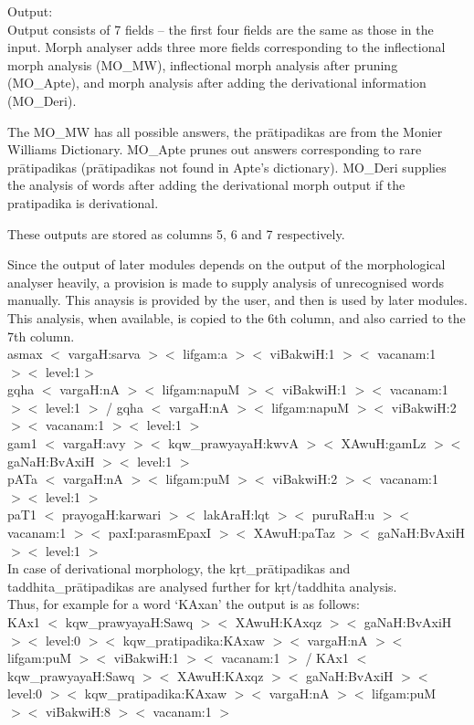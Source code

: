 \documentclass{llncs}
\begin{document}
\noindent 
Output:\\
Output consists of 7 fields -- the first four fields are the same as those in the input. Morph analyser adds three more fields corresponding to the inflectional morph analysis (MO\_MW), inflectional morph analysis after pruning (MO\_Apte), and morph analysis after adding the derivational information (MO\_Deri).

\noindent 
The MO\_MW has all possible answers, the pr\={a}tipadikas are from the Monier Williams Dictionary. MO\_Apte prunes out answers corresponding to rare pr\={a}tipadikas (pr\={a}tipadikas not found in Apte's dictionary). MO\_Deri supplies the analysis of words after adding the derivational morph output if the pratipadika is derivational.

\noindent 
These outputs are stored as columns 5, 6 and 7 respectively.

\noindent 
Since the output of later modules depends on the output of the morphological analyser heavily, a provision is made to supply analysis of unrecognised words manually. This anaysis is provided by the user, and then is used by later modules.
This analysis, when available, is copied to the  6th column, and also carried to the 7th column.\\
asmax $<$ vargaH:sarva $><$ lifgam:a $><$ viBakwiH:1 $><$ vacanam:1 $><$ level:1$>$\\
gqha $<$ vargaH:nA $><$ lifgam:napuM $><$ viBakwiH:1 $><$ vacanam:1 $><$ level:1 $>$ / 
gqha $<$ vargaH:nA $><$ lifgam:napuM $><$ viBakwiH:2 $><$ vacanam:1 $><$ level:1 $>$\\
gam1 $<$ vargaH:avy $><$ kqw\_prawyayaH:kwvA $><$ XAwuH:gamLz $><$ gaNaH:BvAxiH $><$ level:1 $>$\\
pATa $<$ vargaH:nA $><$ lifgam:puM $><$ viBakwiH:2 $><$ vacanam:1 $><$ level:1 $>$\\
paT1 $<$ prayogaH:karwari $><$ lakAraH:lqt $><$ puruRaH:u $><$ vacanam:1 $><$ paxI:parasmEpaxI $><$ XAwuH:paTaz $><$ gaNaH:BvAxiH $><$ level:1 $>$\\
 
\noindent 
In case of derivational morphology, the k\d{r}t\_pr\={a}tipadikas and taddhita\_pr\={a}tipadikas are analysed further for k\d{r}t/taddhita analysis.\\

\noindent 
Thus, for example for a word `KAxan' the output is as follows:\\
KAx1 $<$ kqw\_prawyayaH:Sawq $><$ XAwuH:KAxqz $><$ gaNaH:BvAxiH $><$ level:0 $><$ kqw\_pratipadika:KAxaw $><$ vargaH:nA $><$ lifgam:puM $><$ viBakwiH:1 $><$ vacanam:1 $>$ /
KAx1 $<$ kqw\_prawyayaH:Sawq $><$ XAwuH:KAxqz $><$ gaNaH:BvAxiH $><$ level:0 $><$ kqw\_pratipadika:KAxaw $><$ vargaH:nA $><$ lifgam:puM $><$ viBakwiH:8 $><$ vacanam:1 $>$\\
\end{document}
